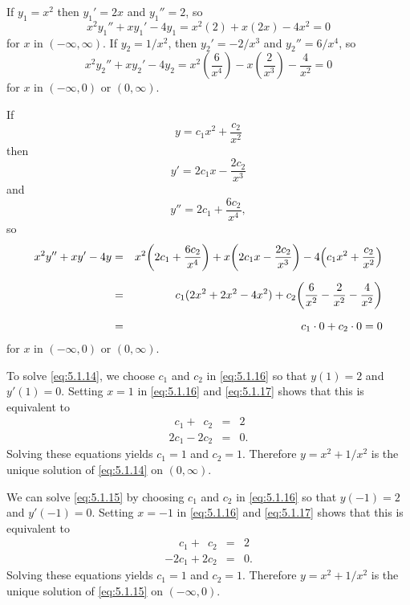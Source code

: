 \begin{examplesolution}
 If $y_{1}=x^{2}$ then $y_{1}'=2x$ and $y_{1}''=2$, so
\[
  x^{2}y_{1}''+xy_{1}'-4y_{1}=x^{2}(2)+x(2x)-4x^{2}=0
\]
for $x$ in $(-\infty,\infty)$. If $y_{2}=1/x^{2}$, then $y_{2}'=-2/x^{3}$ and $y_{2}''=6/x^{4}$, so
\[
  x^{2}y_{2}''+xy_{2}'-4y_{2}=x^{2}\left(\frac{6}{x^{4}}\right)-x\left(\frac{2}{x^{3}}\right)-\frac{4}{x^{2}}=0
\]
for $x$ in $(-\infty,0)$ or $(0,\infty)$.

 If
\begin{equation}
  \label{eq:5.1.16}y=c_{1}x^{2}+\frac{c_{2}}{x^{2}}
\end{equation}
then
\begin{equation}
  \label{eq:5.1.17}y'=2c_{1}x-\frac{2c_{2}}{x^{3}}
\end{equation}
and
\[
  y''=2c_{1}+\frac{6c_{2}}{x^{4}},
\]
so
\begin{eqnarray*}
  x^{2}y''+xy'-4y & = & x^{2}\displaystyle{\left(2c_{1}+\frac{6c_{2}}{x^{4}}\right)}+x\displaystyle{\left(2c_{1}x-\frac{2c_{2}}{x^{3}}\right)}-4\displaystyle{\left(c_{1}x^{2}+\frac{c_{2}}{x^{2}}\right)} \\[2\jot]
                  & = & c_{1}(2x^{2}+2x^{2}-4x^{2})+c_{2}\displaystyle{\left(\frac{6}{x^{2}}-\frac{2}{x^{2}}-\frac{4}{x^{2}}\right)}                                                     \\[2\jot]
                  & = & c_{1}\cdot0+c_{2}\cdot0=0
\end{eqnarray*}
for $x$ in $(-\infty,0)$ or $(0,\infty)$.

 To solve \eqref{eq:5.1.14}, we choose $c_{1}$ and $c_{2}$ in \eqref{eq:5.1.16} so
that $y(1)=2$ and $y'(1)=0$. Setting $x=1$ in \eqref{eq:5.1.16} and \eqref{eq:5.1.17} shows that
this is equivalent to
\begin{eqnarray*}
  \phantom{2}c_{1}+\phantom{2}c_{2} & = & 2 \\
  2c_{1}-2c_{2}                     & = & 0.
\end{eqnarray*}
Solving these equations yields $c_{1}=1$ and $c_{2}=1$. Therefore $y=x^{2}+1/x^{2}$ is the unique
solution of \eqref{eq:5.1.14} on $(0,\infty)$.

 We can solve \eqref{eq:5.1.15} by choosing $c_{1}$ and $c_{2}$ in \eqref{eq:5.1.16}
so that $y(-1)=2$ and $y'(-1)=0$. Setting $x=-1$ in \eqref{eq:5.1.16} and \eqref{eq:5.1.17} shows
that this is equivalent to
\begin{eqnarray*}
  \phantom{-2}c_{1}+\phantom{2}c_{2} & = & 2 \\
  -2c_{1}+2c_{2}                     & = & 0.
\end{eqnarray*}
Solving these equations yields $c_{1}=1$ and $c_{2}=1$. Therefore $y=x^{2}+1/x^{2}$ is the unique
solution of \eqref{eq:5.1.15} on $(-\infty,0)$. \bbox


\end{examplesolution}
